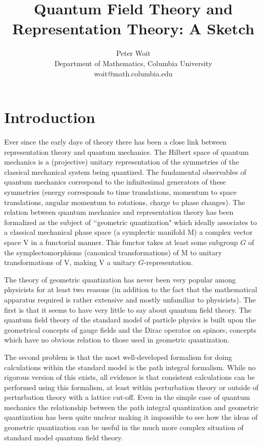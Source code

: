 \documentclass[a4paper,a4paper]{article}
\author{Peter Woit \\
Department of Mathematics, Columbia University\\
woit@math.columbia.edu}
\title{Quantum Field Theory and Representation Theory: A Sketch}
\theoremstyle{conjecture}
\begin{document}
\maketitle
\tableofcontents
\section{Introduction}

Ever since the early days of theory there has been a close link
between representation theory and quantum mechanics. The Hilbert
space of quantum mechanics is a (projective) unitary representation of the
symmetries of the classical mechanical system being quantized. The
fundamental observables of quantum mechanics correspond to the
infinitesimal generators of these symmetries (energy corresponds
to time translations, momentum to space translations, angular
momentum to rotations, charge to phase changes). The relation
between quantum mechanics and representation theory has been
formalized as the subject of \lq\lq geometric quantization" which
ideally associates to a classical mechanical phase space (a
symplectic manifold M) a complex vector space V in a functorial
manner. This functor takes at least some subgroup $G$ of the
symplectomorphisms (canonical transformations) of M to unitary
transformations of V, making V a unitary $G$-representation.

The theory of geometric quantization has never been very popular among physicists for at least
two reasons (in addition to the fact that the mathematical apparatus required is rather
extensive and mostly unfamiliar to physicists). The first is that it seems to have very little
to say about quantum field theory.  The quantum field theory of the standard model of particle
physics is built upon the geometrical concepts of gauge fields and the Dirac operator on
spinors, concepts which have no obvious relation to those used in geometric quantization.

The second problem is that the most well-developed formalism for doing calculations within
the standard model is the path integral formalism.  While no rigorous version of this exists,
all evidence is that consistent calculations can be performed using this formalism, at least
within perturbation theory or outside of perturbation theory with a lattice cut-off. Even in the
simple case of quantum mechanics the relationship between the path integral quantization and
geometric quantization has been quite unclear making it impossible to see how the ideas of
geometric quantization can be useful in the much more complex situation of standard model
quantum field theory.
\end{document}
